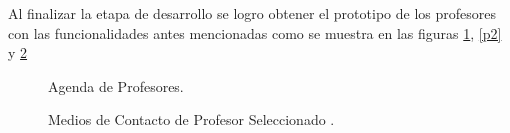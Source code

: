 Al finalizar la etapa de desarrollo se logro obtener el prototipo de los profesores con las funcionalidades antes mencionadas como se muestra en las figuras \ref{p1}, \ref{p2} y \ref{p3}
\begin{figure}[h!]
	\begin{center}
		\caption{Agenda de Profesores.}
		\label{p1}
	\end{center}
\end{figure}

\begin{figure}[h!]
	\begin{center}
		\caption{Medios de Contacto de Profesor Seleccionado .}
		\label{p3}
	\end{center}
\end{figure}

